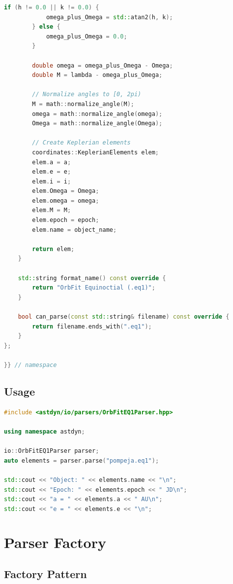 \begin{lstlisting}[language=C++,caption={OrbFitEQ1Parser implementation}]
        if (h != 0.0 || k != 0.0) {
            omega_plus_Omega = std::atan2(h, k);
        } else {
            omega_plus_Omega = 0.0;
        }
        
        double omega = omega_plus_Omega - Omega;
        double M = lambda - omega_plus_Omega;
        
        // Normalize angles to [0, 2pi)
        M = math::normalize_angle(M);
        omega = math::normalize_angle(omega);
        Omega = math::normalize_angle(Omega);
        
        // Create Keplerian elements
        coordinates::KeplerianElements elem;
        elem.a = a;
        elem.e = e;
        elem.i = i;
        elem.Omega = Omega;
        elem.omega = omega;
        elem.M = M;
        elem.epoch = epoch;
        elem.name = object_name;
        
        return elem;
    }
    
    std::string format_name() const override {
        return "OrbFit Equinoctial (.eq1)";
    }
    
    bool can_parse(const std::string& filename) const override {
        return filename.ends_with(".eq1");
    }
};

}} // namespace
\end{lstlisting}

\subsection{Usage}

\begin{lstlisting}[language=C++]
#include <astdyn/io/parsers/OrbFitEQ1Parser.hpp>

using namespace astdyn;

io::OrbFitEQ1Parser parser;
auto elements = parser.parse("pompeja.eq1");

std::cout << "Object: " << elements.name << "\n";
std::cout << "Epoch: " << elements.epoch << " JD\n";
std::cout << "a = " << elements.a << " AU\n";
std::cout << "e = " << elements.e << "\n";
\end{lstlisting}

\section{Parser Factory}

\subsection{Factory Pattern}


